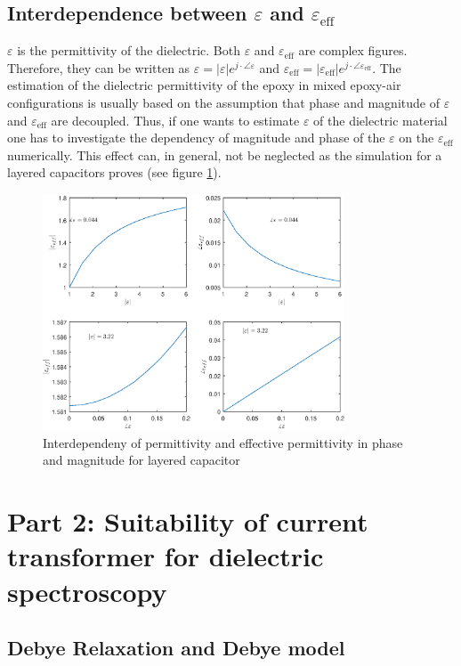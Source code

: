 \subsection{Interdependence between $\varepsilon$ and $\varepsilon_{\textrm{eff}}$} 
$\varepsilon$ is the permittivity of the dielectric. Both $\varepsilon$ and $\varepsilon_{\textrm{eff}}$ are complex figures. Therefore, they can be written as $\varepsilon = |\varepsilon| e^{j \cdot \angle \varepsilon} $ and $\varepsilon_{\textrm{eff}} = |\varepsilon_{\textrm{eff}}| e^{j \cdot \angle \varepsilon_{\textrm{eff}}} $.	
The estimation of the dielectric permittivity of the epoxy in mixed epoxy-air configurations is usually based on the assumption that phase and magnitude of $\varepsilon$ and $\varepsilon_{\textrm{eff}}$ are decoupled. Thus, if one wants to estimate $\varepsilon$ of the dielectric material one has to investigate the dependency of magnitude and phase of the $\varepsilon$ on the $\varepsilon_{\textrm{eff}}$ numerically. This effect can, in general, not be neglected as the simulation for a layered capacitors proves (see figure \ref{fig.layered}).  
\begin{figure}

	\includegraphics[width=0.8\textwidth]{figures/Theory/layereddielectrics.eps}
	\caption[Kurze Abbildungsbeschreibung]{Interdependeny of permittivity and effective permittivity in phase and magnitude for layered capacitor}
	\label{fig.layered}
\end{figure}
	
	
\section{Part 2: Suitability of current transformer for dielectric spectroscopy}
\subsection{Debye Relaxation and Debye model}



